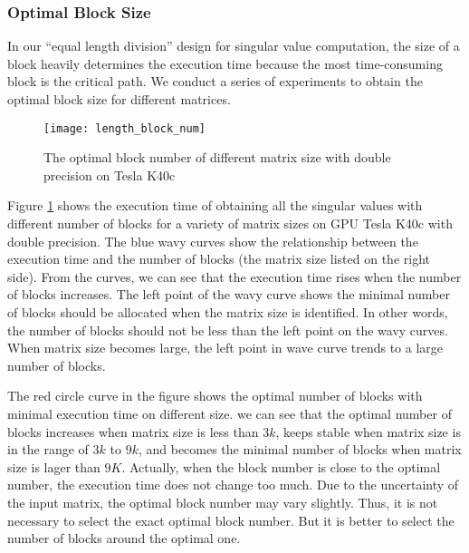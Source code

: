\subsubsection{Optimal Block Size}
In our ``equal length division'' design for singular value computation, the size of a block heavily determines the execution time because the most time-consuming block is the critical path. 
We conduct a series of experiments to obtain the optimal block size for different matrices.
\begin{figure}[hbpt]
\centering
\texttt{[image: length\_block\_num]}
\caption{The optimal block number of different matrix size with double precision on Tesla K40c}
\label{fig:length_block_num}
\end{figure}
Figure \ref{fig:length_block_num} shows the execution time of obtaining all the singular values with different number of blocks for a variety of matrix sizes on GPU Tesla K40c with double precision.
The blue wavy curves show the relationship between the execution time and the number of blocks (the matrix size listed on the right side).
From the curves, we can see that the execution time rises when the number of blocks increases.
The left point of the wavy curve shows the minimal number of blocks should be allocated when the matrix size is identified.
In other words, the number of blocks should not be less than the left point on the wavy curves.
When matrix size becomes large, the left point in wave curve trends to a large number of blocks.

The red circle curve in the figure shows the optimal number of blocks with minimal execution time on different size.
we can see that the optimal number of blocks increases when matrix size is less than $3k$,
keeps stable when matrix size is in the range of $3k$ to $9k$,
and becomes the minimal number of blocks when matrix size is lager than $9K$.
Actually, when the block number is close to the optimal number, the execution time does not change too much.
Due to the uncertainty of the input matrix, the optimal block number may vary slightly.
Thus, it is not necessary to select the exact optimal block number.
But it is better to select the number of blocks around the optimal one.

